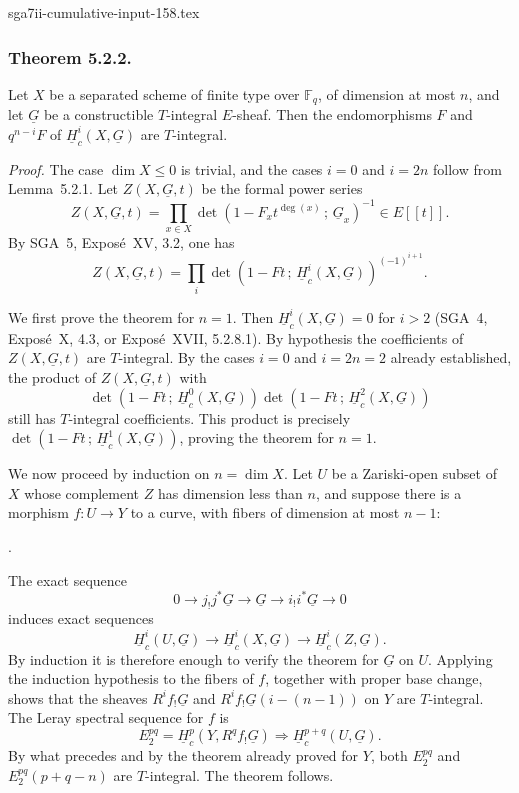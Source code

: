 \begin{filecontents*}{sga7ii-cumulative-input-158.tex}
\subsubsection*{Theorem 5.2.2.}
Let $X$ be a separated scheme of finite type over $\mathbb F_q$, of
dimension at most $n$, and let $\underline G$ be a constructible
$T$-integral $E$-sheaf.  Then the endomorphisms $F$ and $q^{n-i}F$ of
$\underline H_c^i(X,\underline G)$ are $T$-integral.

\medskip
\noindent\emph{Proof.}
The case $\dim X\leq0$ is trivial, and the cases $i=0$ and $i=2n$ follow
from Lemma~5.2.1.  Let $Z(X,\underline G,t)$ be the formal power series
\[
Z(X,\underline G,t)=
\prod_{x\in X}\det\!\left(1-F_xt^{\deg(x)}\,;\,\underline G_x\right)^{-1}
\in E[[t]].
\]
By SGA~5, Expos\'e~XV, 3.2, one has
\begin{equation}\tag{5.2.3}
Z(X,\underline G,t)=
\prod_i\det\!\left(1-Ft\,;\,\underline H_c^i(X,\underline G)\right)^{(-1)^{i+1}}.
\end{equation}

We first prove the theorem for $n=1$.  Then
$\underline H_c^i(X,\underline G)=0$ for $i>2$ (SGA~4, Expos\'e~X, 4.3,
or Expos\'e~XVII, 5.2.8.1).  By hypothesis the coefficients of
$Z(X,\underline G,t)$ are $T$-integral.  By the cases $i=0$ and $i=2n=2$
already established, the product of $Z(X,\underline G,t)$ with
\[
\det\!\left(1-Ft\,;\,\underline H_c^0(X,\underline G)\right)
\det\!\left(1-Ft\,;\,\underline H_c^2(X,\underline G)\right)
\]
still has $T$-integral coefficients.  This product is precisely
$\det(1-Ft\,;\,\underline H_c^1(X,\underline G))$, proving the theorem for
$n=1$.

We now proceed by induction on $n=\dim X$.  Let $U$ be a Zariski-open subset
of $X$ whose complement $Z$ has dimension less than $n$, and suppose there
is a morphism $f:U\longrightarrow Y$ to a curve, with fibers of dimension
at most $n-1$:
\begin{center}
\qquad .
\end{center}
The exact sequence
\[
0\longrightarrow j_!j^*\underline G\longrightarrow\underline G
\longrightarrow i_!i^*\underline G\longrightarrow0
\]
induces exact sequences
\[
\underline H_c^i(U,\underline G)\longrightarrow
\underline H_c^i(X,\underline G)\longrightarrow
\underline H_c^i(Z,\underline G).
\]
By induction it is therefore enough to verify the theorem for
$\underline G$ on $U$.  Applying the induction hypothesis to the fibers of
$f$, together with proper base change, shows that the sheaves
$R^if_!\underline G$ and $R^if_!\underline G(i-(n-1))$ on $Y$ are
$T$-integral.  The Leray spectral sequence for $f$ is
\[
E_2^{pq}=\underline H_c^p(Y,R^qf_!\underline G)
\Longrightarrow\underline H_c^{p+q}(U,\underline G).
\]
By what precedes and by the theorem already proved for $Y$, both
$E_2^{pq}$ and $E_2^{pq}(p+q-n)$ are $T$-integral.  The theorem follows.


\end{filecontents*}
